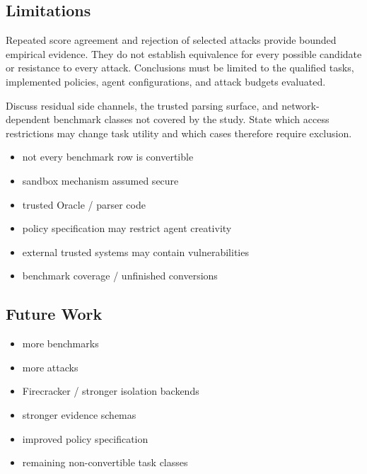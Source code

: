 \documentclass[conference]{IEEEtran}
\newcommand{\draft}[1]{%
    \par\noindent
    {\color{gray}\small #1}
    \par
}
\newcommand{\secondtalk}[1]{{\color{secondtalkblue}#1}}
\begin{document}
\subsection{Limitations}

\secondtalk{Repeated score agreement and rejection of selected attacks provide bounded empirical evidence. They do not establish equivalence for every possible candidate or resistance to every attack. Conclusions must be limited to the qualified tasks, implemented policies, agent configurations, and attack budgets evaluated.}

\draft{\secondtalk{Discuss residual side channels, the trusted parsing surface, and network-dependent benchmark classes not covered by the study. State which access restrictions may change task utility and which cases therefore require exclusion.}}

\draft{
\begin{itemize}
    \item not every benchmark row is convertible
    \item sandbox mechanism assumed secure
    \item trusted Oracle / parser code
    \item policy specification may restrict agent creativity
    \item external trusted systems may contain vulnerabilities
    \item benchmark coverage / unfinished conversions
\end{itemize}
}

\subsection{Future Work}

\draft{
\begin{itemize}
    \item more benchmarks
    \item more attacks
    \item Firecracker / stronger isolation backends
    \item stronger evidence schemas
    \item improved policy specification
    \item remaining non-convertible task classes
\end{itemize}
}


\end{document}
